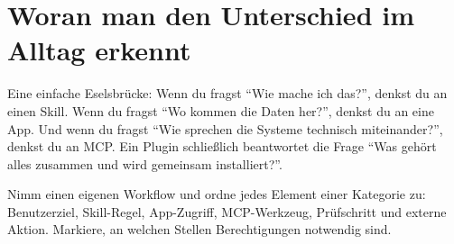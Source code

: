 \section{Woran man den Unterschied im Alltag erkennt}

Eine einfache Eselsbrücke: Wenn du fragst ``Wie mache ich das?'', denkst du an einen Skill. Wenn du fragst ``Wo kommen die Daten her?'', denkst du an eine App. Und wenn du fragst ``Wie sprechen die Systeme technisch miteinander?'', denkst du an MCP. Ein Plugin schließlich beantwortet die Frage ``Was gehört alles zusammen und wird gemeinsam installiert?''.

\begin{praxis}
Nimm einen eigenen Workflow und ordne jedes Element einer Kategorie zu: Benutzerziel, Skill-Regel, App-Zugriff, MCP-Werkzeug, Prüfschritt und externe Aktion. Markiere, an welchen Stellen Berechtigungen notwendig sind.
\end{praxis}
